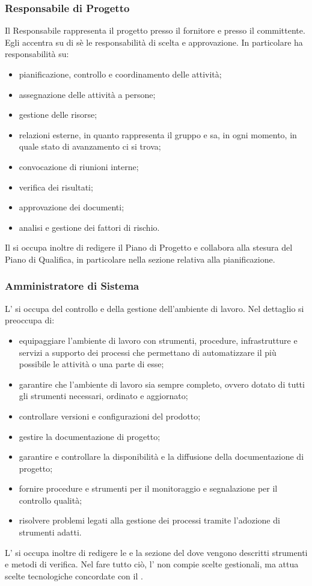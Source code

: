 		\subsubsection{Responsabile di Progetto}
			Il Responsabile rappresenta il progetto presso il fornitore e presso il committente. Egli accentra su di sè le responsabilità di scelta e approvazione. In particolare ha responsabilità su:
			\begin{itemize}
				\item pianificazione, controllo e coordinamento delle attività;
				\item assegnazione delle attività a persone;
				\item gestione delle risorse;
				\item relazioni esterne, in quanto rappresenta il gruppo e sa, in ogni momento, in quale stato di avanzamento ci si trova;
				\item convocazione di riunioni interne;
				\item verifica dei risultati;
				\item approvazione dei documenti;
				\item analisi e gestione dei fattori di rischio.
			\end{itemize}
			Il  si occupa inoltre di redigere il Piano di Progetto e collabora alla stesura del Piano di Qualifica, in particolare nella sezione relativa alla pianificazione.
		\subsubsection{Amministratore di Sistema}
			L' si occupa del controllo e della gestione dell'ambiente di lavoro. Nel dettaglio si preoccupa di:
			\begin{itemize}
				\item equipaggiare l'ambiente di lavoro con strumenti, procedure, infrastrutture e servizi a supporto dei processi che permettano di automatizzare il più possibile le attività o una parte di esse;
				\item garantire che l’ambiente di lavoro sia sempre completo, ovvero dotato di tutti gli strumenti necessari, ordinato e aggiornato;
				\item controllare versioni e configurazioni del prodotto;
				\item gestire la documentazione di progetto;
				\item garantire e controllare la disponibilità e la diffusione della documentazione di progetto;
				\item fornire procedure e strumenti per il monitoraggio e segnalazione per il controllo qualità;
				\item risolvere problemi legati alla gestione dei processi tramite l'adozione di strumenti adatti.
			\end{itemize}
			L' si occupa inoltre di redigere le  e la sezione del  dove vengono descritti strumenti e metodi di verifica. Nel fare tutto ciò, l' non compie scelte gestionali, ma attua scelte tecnologiche concordate con il .
